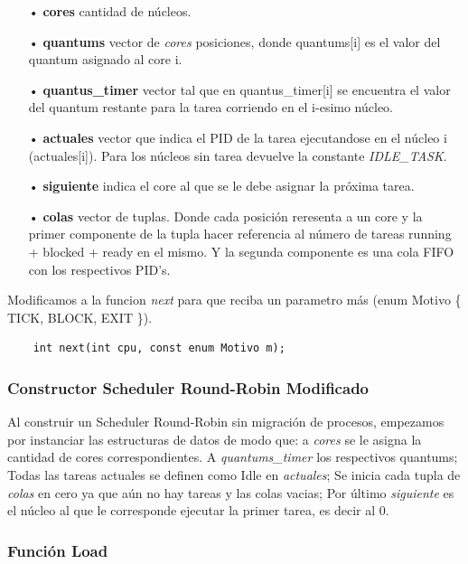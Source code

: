 \documentclass[a4paper]{article}
\begin{document}
	\begin{itemize}
	\item[•]\textbf{cores} cantidad de n\'ucleos.
	\item[•]\textbf{quantums} vector de \emph{cores} posiciones, donde quantums[i] es el valor del quantum asignado al core i.
	\item[•]\textbf{quantus_timer}  vector tal que en quantus_timer[i] se encuentra el valor del quantum restante para la tarea corriendo en el i-esimo núcleo.
	\item[•]\textbf{actuales} vector que indica el PID de la tarea ejecutandose en el núcleo i (actuales[i]). Para los núcleos sin tarea devuelve la constante \textit{IDLE\_TASK}.
	\item[•]\textbf{siguiente} indica el core al que se le debe asignar la próxima tarea.
	\item[•]\textbf{colas} vector de tuplas. Donde cada posición reresenta a un core y la primer componente de la tupla hacer referencia al número de tareas running + blocked + ready en el mismo. Y la segunda componente es una cola FIFO con los respectivos PID's.  
	\end{itemize}	
	
\noindent  Modificamos a la funcion \emph{next} para que reciba un parametro m\'as (enum Motivo \{ TICK, BLOCK, EXIT \}).
	\begin{codesnippet}
	\begin{verbatim}
    int next(int cpu, const enum Motivo m);
	\end{verbatim}
	\end{codesnippet}
		
\subsubsection*{Constructor Scheduler Round-Robin Modificado}		

Al construir un Scheduler Round-Robin sin migración de procesos, empezamos por instanciar las estructuras de datos de modo que: a \emph{cores} se le asigna la cantidad de cores correspondientes. A \emph{quantums\_timer} los respectivos quantums; Todas las tareas actuales se definen como Idle en \emph{actuales}; Se inicia cada tupla de \emph{colas} en cero ya que aún no hay tareas y las colas vacias; Por último \emph{siguiente} es el n\'ucleo al que le corresponde ejecutar la primer tarea, es decir al 0.

\subsubsection*{Funci\'on Load}
\end{document}
